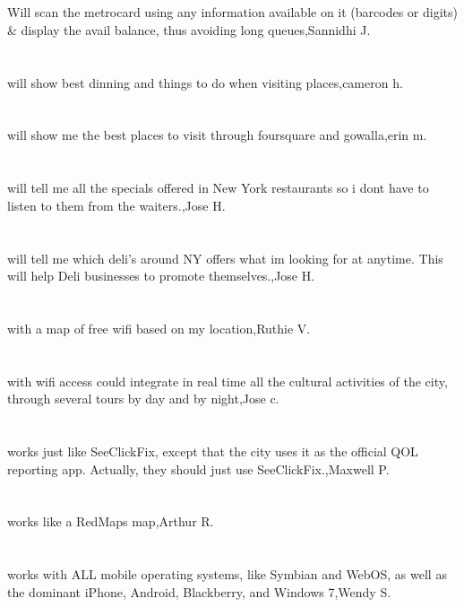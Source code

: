 \section{}Will scan the metrocard using any information available on it (barcodes or digits) \& display the avail balance, thus avoiding long queues,Sannidhi J.	
\section{} will show best dinning and things to do when visiting places,cameron h.	
\section{} will show me the best places to visit through foursquare and gowalla,erin m.	
\section{}will tell me all the specials offered in New York restaurants so i dont have to listen to them from the waiters.,Jose H.	
\section{}will tell me which deli's around NY offers what im looking for at anytime. This will help Deli businesses to promote themselves.,Jose H.	
\section{}with a map of free wifi based on my location,Ruthie V.	
\section{}with wifi access could integrate in real time all the cultural activities of the city, through several tours by day and by night,Jose c.	
\section{}works just like SeeClickFix, except that the city uses it as the official QOL reporting app.  Actually, they should just use SeeClickFix.,Maxwell P.	
\section{}works like a RedMaps map,Arthur R.	
\section{}works with ALL mobile operating systems, like Symbian and WebOS, as well as the dominant iPhone, Android, Blackberry, and Windows 7,Wendy S.	
